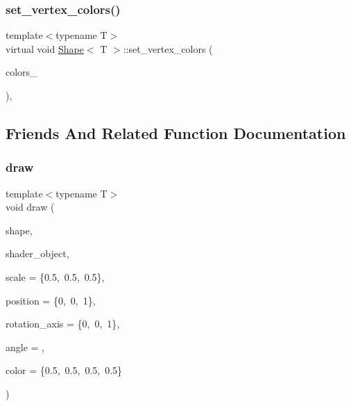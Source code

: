 \subsubsection{\texorpdfstring{set\+\_\+vertex\+\_\+colors()}{set\_vertex\_colors()}}
{\footnotesize\ttfamily template$<$typename T$>$ \\
virtual void \mbox{\hyperlink{classShape}{Shape}}$<$ T $>$\+::set\+\_\+vertex\+\_\+colors (\begin{DoxyParamCaption}\item[{\mbox{\hyperlink{type__definitions_8hpp_accb98a876f193a416d9c8a02fe22d526}{aligned\+\_\+vector}}$<$ float $>$ \&}]{colors\+\_\+ }\end{DoxyParamCaption})\hspace{0.3cm}{\ttfamily [inline]}, {\ttfamily [virtual]}}



\subsection{Friends And Related Function Documentation}
\mbox{\label{classShape_a0f7d9c8330ae4f062c6f569a7400e1f0}} 
\subsubsection{\texorpdfstring{draw}{draw}\hspace{0.1cm}{\footnotesize\ttfamily [1/2]}}
{\footnotesize\ttfamily template$<$typename T$>$ \\
void draw (\begin{DoxyParamCaption}\item[{\mbox{\hyperlink{classShape}{Shape}}$<$ T $>$ \&}]{shape,  }\item[{\mbox{\hyperlink{classShader}{Shader}}$<$ \mbox{\hyperlink{render_8hpp_a24e288e18eb7b6e01de7565001fedb60aa98862073f71a928bad5099cc3e1c2ed}{R\+E\+N\+D\+E\+R\+\_\+\+T\+Y\+P\+E\+::\+U\+N\+I\+F\+O\+R\+M\+\_\+\+C\+O\+L\+OR}} $>$ \&}]{shader\+\_\+object,  }\item[{std\+::array$<$ float, 3 $>$}]{scale = {\ttfamily \{0.5,~0.5,~0.5\}},  }\item[{std\+::array$<$ float, 3 $>$}]{position = {\ttfamily \{0,~0,~1\}},  }\item[{std\+::array$<$ float, 3 $>$}]{rotation\+\_\+axis = {\ttfamily \{0,~0,~1\}},  }\item[{float}]{angle = {},  }\item[{glm\+::vec4}]{color = {\ttfamily \{0.5,~0.5,~0.5,~0.5\}} }\end{DoxyParamCaption})\hspace{0.3cm}{\ttfamily [friend]}}

